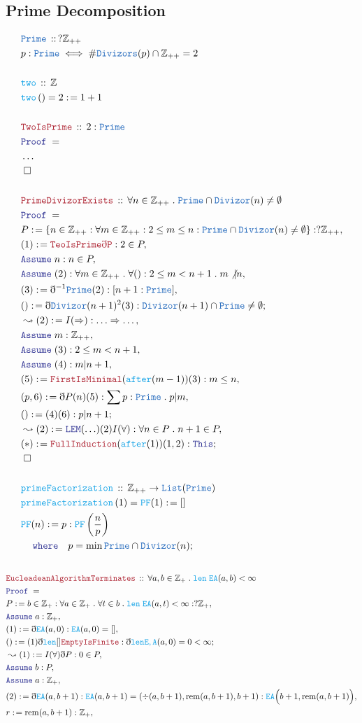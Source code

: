 \documentclass[12pt]{scrartcl}
\newcommand{\TYPE}[1]{\textcolor{NavyBlue}{\mathtt{#1}}}
\newcommand{\FUNC}[1]{\textcolor{Cerulean}{\mathtt{#1}}}
\newcommand{\LOGIC}[1]{\textcolor{Blue}{\mathtt{#1}}}
\newcommand{\THM}[1]{\textcolor{Maroon}{\mathtt{#1}}}
\renewcommand{\.}{\; . \;}
\newcommand{\de}{: \kern 0.1pc =}
\newcommand{\where}{\LOGIC{where}}
\newcommand{\Act}[1]{\left( #1 \right)}
\newcommand{\Theorem}[2]{& \THM{#1} \, :: \, #2 \\ & \Proof = \\ }
\newcommand{\DeclareType}[2]{& \TYPE{#1} \, :: \, #2 \\}
\newcommand{\DefineType}[3]{& #1 : \TYPE{#2} \iff #3 \\}
\newcommand{\DeclareFunc}[2]{& \FUNC{#1} \, :: \, #2 \\}
\newcommand{\DefineNamedFunc}[4]{&  \FUNC{#1}\Act{#2} = #3 \de #4 \\}
\newcommand{\NewLine}{\\ & \kern 1pc}
\newcommand{\Page}[1]{ \begin{align*} #1 \end{align*}   }
\newcommand{ \bd }{ \ByDef }
\newcommand{\NoProof}{ & \ldots \\ \EndProof}
\newcommand{\Int}{\mathbb{Z} }
\newcommand{\Say}[3]{& #1 \de #2 : #3, \\}
\newcommand{\Conclude}[3]{& #1 \de #2 : #3; \\}
\newcommand{\Derive}[3]{& \leadsto #1 \de #2 : #3, \\}
\newcommand{\Assume}[2]{& \LOGIC{Assume} \; #1 : #2, \\}
\newcommand{\QED}{\; \square}
\newcommand{\EndProof}{& \QED \\}
\newcommand{\ByDef}{\eth}
\newcommand{\Proof}{\LOGIC{Proof} \; }
\DeclareMathOperator{\remi}{rem}
\begin{document}
\subsection{Prime Decomposition}
\Page{
	\DeclareType{Prime}{?\Int_{++}}
	\DefineType{p}{Prime}{ \# \TYPE{Divizors}(p) \cap \Int_{++} = 2  }
	\\
	\DeclareFunc{two}{\Int}
	\DefineNamedFunc{two}{}{2}{1 + 1}
	\\
	\Theorem{TwoIsPrime}{2 : \TYPE{Prime}}
	\NoProof
	\\
	\Theorem{PrimeDivizorExists}{\forall n \in \Int_{++} \. \TYPE{Prime} \cap \TYPE{Divizor}(n) \neq \emptyset }
	\Say{P}{\{ n \in \Int_{++} : \forall m \in \Int_{++} : 2 \le m \le n : \TYPE{Prime} \cap \TYPE{Divizor}(n) \neq \emptyset  \}}{?\Int_{++}}
	\Say{(1)}{\THM{TeoIsPrime\bd P}}{2 \in P}
	\Assume{n}{n \in P}
	\Assume{(2)}{\forall m \in \Int_{++} \. \forall () : 2 \le m < n + 1 \. m \not | n}
	\Say{(3)}{\bd^{-1} \TYPE{Prime}(2)}{ [n + 1 : \TYPE{Prime}]  }
	\Conclude{()}{\bd \TYPE{Divizor}(n + 1)^2(3)}{\TYPE{Divizor}(n + 1) \cap \TYPE{Prime} \neq \emptyset}
	\Derive{(2)}{I(\Rightarrow)}{\ldots \Rightarrow \ldots}
	\Assume{m}{\Int_{++}}
	\Assume{(3)}{ 2 \le m < n + 1 }
	\Assume{(4)}{ m | n + 1  }
	\Say{(5)}{\THM{FirstIsMinimal}(\FUNC{after}(m-1))(3)}{m \le n }
	\Say{(p,6)}{\bd P(n)(5)}{\sum p : \TYPE{Prime} \. p | m  }
	\Conclude{()}{(4)(6)}{p|n + 1}
	\Derive{(2)}{ \LOGIC{LEM}(\ldots)(2)I(\forall)}{ \forall n \in P \. n+1 \in P   }
	\Conclude{(*)}{\THM{FullInduction}(\FUNC{after}(1))(1,2)}{  \LOGIC{This}   }
	\EndProof
	\\
	\DeclareFunc{primeFactorization}{\Int_{++} \to \TYPE{List}(\TYPE{Prime})}
	\DefineNamedFunc{primeFactorization}{1}{\FUNC{PF}(1)}{[]}
	\Conclude{\FUNC{PF}(n)}{ p}{\FUNC{PF}\left(\frac{n}{p}\right)  \NewLine  \where \quad p = \min \TYPE{Prime} \cap \TYPE{Divizor}(n) }
	\\
}\Page{
	\Theorem{EucleadeanAlgorithmTerminates}{\forall a,b \in \Int_+ \. \FUNC{len} \; \FUNC{EA}(a,b) < \infty}
	\Say{P}{ { b \in \Int_+ : \forall a \in \Int_+ \. \forall t \in b \. \FUNC{len} \; \FUNC{EA}(a,t) < \infty }}{?\Int_+}
	\Assume{a}{\Int_+}
	\Say{(1)}{\bd \FUNC{EA}(a,0)}{\FUNC{EA}(a,0) = []}
	\Conclude{()}{ (1)\bd \FUNC{len} []\THM{EmptyIsFinite}}{ \bd\FUNC{len} \FUNC{E,A}(a,0) = 0 < \infty  }	
	\Derive{(1)}{I(\forall)\bd P }{0 \in P}
	\Assume{b}{P}
	\Assume{a}{\Int_+}
	\Say{(2)}{ \bd \FUNC{EA}(a,b + 1)  }{  \FUNC{EA}(a,b + 1) = (\div(a,b + 1), \remi(a,b + 1), b + 1) : \FUNC{EA}\Big( b + 1, \remi(a,b + 1)  \Big)}
	\Say{r}{\remi(a,b+1)}{\Int_+}
}
\end{document}
